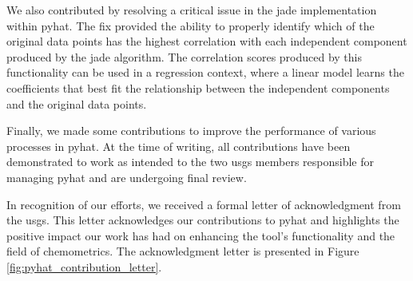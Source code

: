 We also contributed by resolving a critical issue in the \gls{jade} implementation within \gls{pyhat}.
The fix provided the ability to properly identify which of the original data points has the highest correlation with each independent component produced by the \gls{jade} algorithm.
The correlation scores produced by this functionality can be used in a regression context, where a linear model learns the coefficients that best fit the relationship between the independent components and the original data points.

Finally, we made some contributions to improve the performance of various processes in \gls{pyhat}.
At the time of writing, all contributions have been demonstrated to work as intended to the two \gls{usgs} members responsible for managing \gls{pyhat} and are undergoing final review.

In recognition of our efforts, we received a formal letter of acknowledgment from the \gls{usgs}.
This letter acknowledges our contributions to \gls{pyhat} and highlights the positive impact our work has had on enhancing the tool's functionality and the field of chemometrics.
The acknowledgment letter is presented in Figure \ref{fig:pyhat_contribution_letter}.